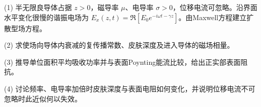 (1) 半无限良导体占据 \(z>0\)，磁导率 \(\mu\)、电导率 \(\sigma>0\)，位移电流可忽略。沿界面水平变化很慢的谐振电场为 \(E_x(z,t)=\Re[E_0e^{-i\omega t-\gamma z}]\)。由Maxwell方程建立扩散型场方程。

(2) 求使场向导体内衰减的复传播常数、皮肤深度及进入导体的磁场相量。

(3) 推导单位面积平均吸收功率并与表面Poynting能流比较，给出正实部表面阻抗。

(4) 讨论频率、电导率加倍时皮肤深度与表面电阻如何变化，并说明位移电流不可忽略时此近似何以失效。
